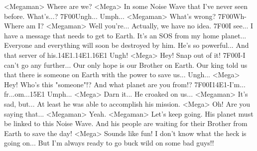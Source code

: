 <Megaman> Where are we? 
<Mega> In some Noise Wave that I've never seen before. 
What's...? 
{7F}{00}Ungh... Umph... 
<Megaman> What's wrong? 
{7F}{00}Wh-Where am I? 
<Megaman> Well you're... Actually, we have no idea. 
{7F}{00}I see... 
I have a message that needs to get to Earth. 
It's an SOS from my home planet... 
Everyone and everything will soon be destroyed by him. He's so powerful... 
And that server of his.{14}{E1}.{14}{E1}.{16}{E1} Ungh! 
<Mega> Hey! Snap out of it! 
{7F}{00}I-I can't go any further... 
Our only hope is our Brother on Earth. 
Our king told us that there is someone on Earth with the power to save us... 
Ungh... 
<Mega> Hey! Who's this "someone"!? 
And what planet are you from!? 
{7F}{00}I{14}{E1}-I'm... fr...om...{15}{E1} 
Umph... 
<Mega> Darn it... He croaked on us... 
<Megaman> It's sad, but... At least he was able to accomplish his mission. 
<Mega> Oh! Are you saying that... 
<Megaman> Yeah. 
<Megaman> Let's keep going. His planet must be linked to this Noise Wave. 
And his people are waiting for their Brother from Earth to save the day! 
<Mega> Sounds like fun! I don't know what the heck is going on... 
But I'm always ready to go buck wild on some bad guys!! 
